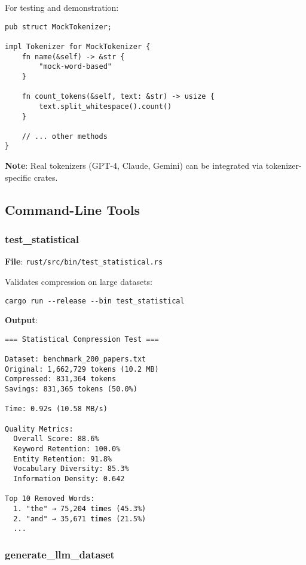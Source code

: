 For testing and demonstration:

\begin{verbatim}
pub struct MockTokenizer;

impl Tokenizer for MockTokenizer {
    fn name(&self) -> &str {
        "mock-word-based"
    }
    
    fn count_tokens(&self, text: &str) -> usize {
        text.split_whitespace().count()
    }
    
    // ... other methods
}
\end{verbatim}

\textbf{Note}: Real tokenizers (GPT-4, Claude, Gemini) can be integrated via tokenizer-specific crates.

\subsection{Command-Line Tools}

\subsubsection{test\_statistical}

\textbf{File}: \texttt{rust/src/bin/test\_statistical.rs}

Validates compression on large datasets:

\begin{verbatim}
cargo run --release --bin test_statistical
\end{verbatim}

\textbf{Output}:
\begin{verbatim}
=== Statistical Compression Test ===

Dataset: benchmark_200_papers.txt
Original: 1,662,729 tokens (10.2 MB)
Compressed: 831,364 tokens
Savings: 831,365 tokens (50.0%)

Time: 0.92s (10.58 MB/s)

Quality Metrics:
  Overall Score: 88.6%
  Keyword Retention: 100.0%
  Entity Retention: 91.8%
  Vocabulary Diversity: 85.3%
  Information Density: 0.642

Top 10 Removed Words:
  1. "the" → 75,204 times (45.3%)
  2. "and" → 35,671 times (21.5%)
  ...
\end{verbatim}

\subsubsection{generate\_llm\_dataset}


